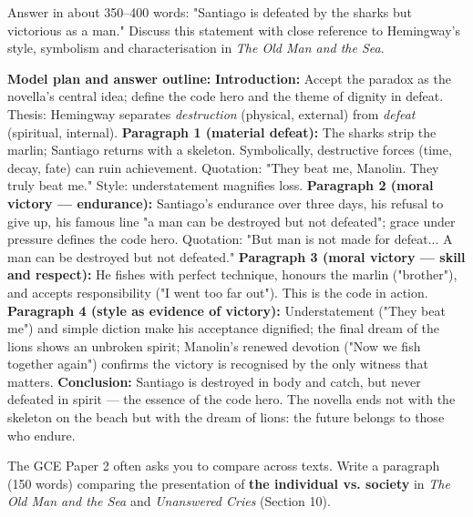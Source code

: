\documentclass[11pt]{article}
\begin{document}
\begin{exercice}
Answer in about 350--400 words: "Santiago is defeated by the sharks but victorious as a man." Discuss this statement with close reference to Hemingway's style, symbolism and characterisation in \emph{The Old Man and the Sea}.
\end{exercice}

\begin{corrige}[Exercise 1]
\textbf{Model plan and answer outline:}
\textbf{Introduction:} Accept the paradox as the novella's central idea; define the code hero and the theme of dignity in defeat. Thesis: Hemingway separates \emph{destruction} (physical, external) from \emph{defeat} (spiritual, internal).
\textbf{Paragraph 1 (material defeat):} The sharks strip the marlin; Santiago returns with a skeleton. Symbolically, destructive forces (time, decay, fate) can ruin achievement. Quotation: "They beat me, Manolin. They truly beat me." Style: understatement magnifies loss.
\textbf{Paragraph 2 (moral victory — endurance):} Santiago's endurance over three days, his refusal to give up, his famous line "a man can be destroyed but not defeated"; grace under pressure defines the code hero. Quotation: "But man is not made for defeat... A man can be destroyed but not defeated."
\textbf{Paragraph 3 (moral victory — skill and respect):} He fishes with perfect technique, honours the marlin ("brother"), and accepts responsibility ("I went too far out"). This is the code in action.
\textbf{Paragraph 4 (style as evidence of victory):} Understatement ("They beat me") and simple diction make his acceptance dignified; the final dream of the lions shows an unbroken spirit; Manolin's renewed devotion ("Now we fish together again") confirms the victory is recognised by the only witness that matters.
\textbf{Conclusion:} Santiago is destroyed in body and catch, but never defeated in spirit — the essence of the code hero. The novella ends not with the skeleton on the beach but with the dream of lions: the future belongs to those who endure.
\end{corrige}

\begin{exercice}
The GCE Paper 2 often asks you to compare across texts. Write a paragraph (150 words) comparing the presentation of \textbf{the individual vs. society} in \emph{The Old Man and the Sea} and \emph{Unanswered Cries} (Section 10).
\end{exercice}
\end{document}

